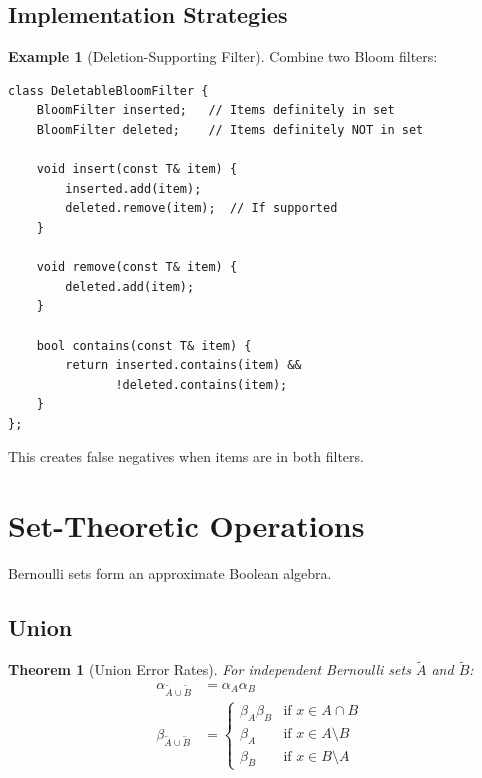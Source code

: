 \documentclass[11pt,twoside,openright]{book}
\theoremstyle{definition}
\newtheorem{example}[definition]{Example}
\theoremstyle{plain}
\newtheorem{theorem}[definition]{Theorem}
\theoremstyle{remark}
\begin{document}
\subsection{Implementation Strategies}

\begin{example}[Deletion-Supporting Filter]
Combine two Bloom filters:
\begin{verbatim}
class DeletableBloomFilter {
    BloomFilter inserted;   // Items definitely in set
    BloomFilter deleted;    // Items definitely NOT in set
    
    void insert(const T& item) {
        inserted.add(item);
        deleted.remove(item);  // If supported
    }
    
    void remove(const T& item) {
        deleted.add(item);
    }
    
    bool contains(const T& item) {
        return inserted.contains(item) && 
               !deleted.contains(item);
    }
};
\end{verbatim}
This creates false negatives when items are in both filters.
\end{example}

\section{Set-Theoretic Operations}

Bernoulli sets form an approximate Boolean algebra.

\subsection{Union}

\begin{theorem}[Union Error Rates]
For independent Bernoulli sets $\tilde{A}$ and $\tilde{B}$:
\begin{align}
\alpha_{\tilde{A} \cup \tilde{B}} &= \alpha_A \alpha_B \\
\beta_{\tilde{A} \cup \tilde{B}} &= \begin{cases}
\beta_A \beta_B & \text{if } x \in A \cap B \\
\beta_A & \text{if } x \in A \setminus B \\
\beta_B & \text{if } x \in B \setminus A
\end{cases}
\end{align}
\end{theorem}
\end{document}
